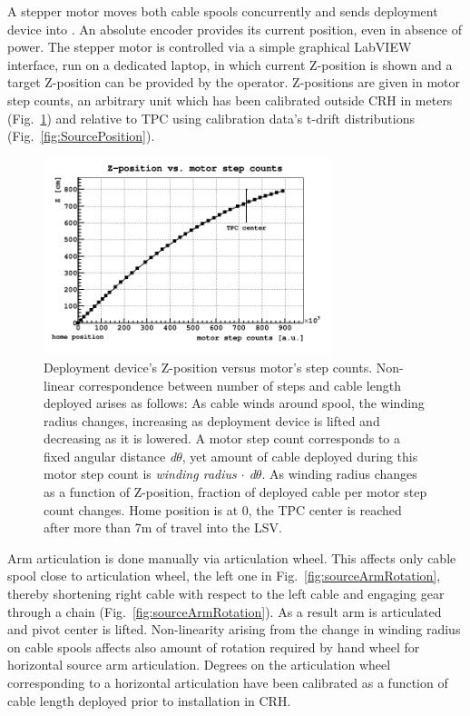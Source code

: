 A stepper motor moves both cable spools concurrently and sends deployment device into \lsv. An absolute encoder provides its current position, even in absence of power. The stepper motor is controlled via a simple graphical LabVIEW interface, run on a dedicated laptop, in which current Z-position is shown and a target Z-position can be provided by the operator. Z-positions are given in motor step counts, an arbitrary unit which has been calibrated outside CRH in meters (Fig.~\ref{fig:z_test}) and relative to TPC using calibration data's t-drift distributions (Fig.~\ref{fig:SourcePosition}).

\begin{figure}[htbp]
 \centering
 \includegraphics[width=0.75\textwidth]{Figures/MSC_Z}
 \caption{Deployment device's Z-position versus motor's step counts. Non-linear correspondence between number of steps and cable length deployed arises as follows: As cable winds around spool, the winding radius changes, increasing as deployment device is lifted and decreasing as it is lowered. A motor step count corresponds to a fixed angular distance \textit{d$\theta$}, yet amount of cable deployed during this motor step count is \textit{winding radius $\cdot$ d$\theta$}. As winding radius changes as a function of Z-position, fraction of deployed cable per motor step count changes. Home position is at 0, the TPC center is reached after more than 7m of travel into the LSV.}
 \label{fig:z_test}
\end{figure}

\label{sec:Nonlinearity:MotorStepCounts}
Arm articulation is done manually via articulation wheel. This affects only cable spool close to articulation wheel, the left one in Fig.~\ref{fig:sourceArmRotation}, thereby shortening right cable with respect to the left cable and engaging gear through a chain (Fig.~\ref{fig:sourceArmRotation}). As a result arm is articulated and pivot center is lifted. Non-linearity arising from the change in winding radius on cable spools affects also amount of rotation required by hand wheel for horizontal source arm articulation.
Degrees on the articulation wheel corresponding to a horizontal articulation have been calibrated as a function of cable length deployed prior to installation in CRH.

